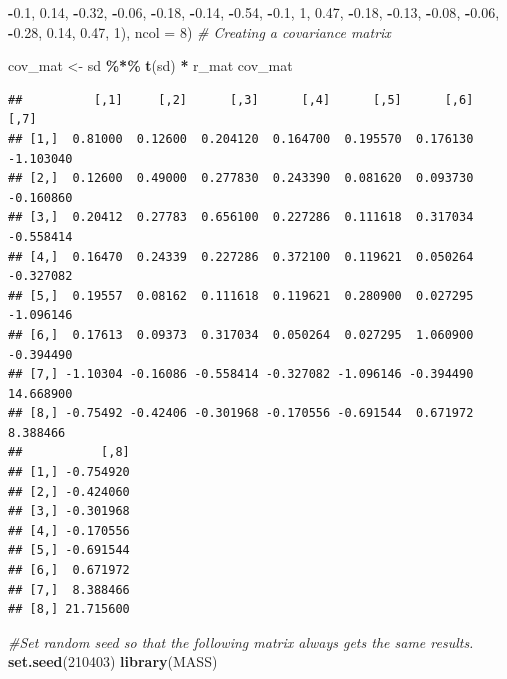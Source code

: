 \documentclass[
  11pt,
]{book}
\newenvironment{Shaded}{\begin{snugshade}}{\end{snugshade}}
\newcommand{\AttributeTok}[1]{\textcolor[rgb]{0.27,0.27,0.27}{#1}}
\newcommand{\CommentTok}[1]{\textcolor[rgb]{0.37,0.37,0.37}{\textit{#1}}}
\newcommand{\DecValTok}[1]{\textcolor[rgb]{0.06,0.06,0.06}{#1}}
\newcommand{\FloatTok}[1]{\textcolor[rgb]{0.06,0.06,0.06}{#1}}
\newcommand{\FunctionTok}[1]{\textcolor[rgb]{0.27,0.27,0.27}{\textbf{#1}}}
\newcommand{\NormalTok}[1]{#1}
\newcommand{\OtherTok}[1]{\textcolor[rgb]{0.37,0.37,0.37}{#1}}
\newcommand{\SpecialCharTok}[1]{\textcolor[rgb]{0.43,0.43,0.43}{\textbf{#1}}}
\begin{document}
\begin{Shaded}
\begin{Highlighting}[]
    \SpecialCharTok{{-}}\FloatTok{0.1}\NormalTok{, }\FloatTok{0.14}\NormalTok{, }\SpecialCharTok{{-}}\FloatTok{0.32}\NormalTok{, }\SpecialCharTok{{-}}\FloatTok{0.06}\NormalTok{, }\SpecialCharTok{{-}}\FloatTok{0.18}\NormalTok{, }\SpecialCharTok{{-}}\FloatTok{0.14}\NormalTok{, }\SpecialCharTok{{-}}\FloatTok{0.54}\NormalTok{, }\SpecialCharTok{{-}}\FloatTok{0.1}\NormalTok{, }\DecValTok{1}\NormalTok{, }\FloatTok{0.47}\NormalTok{, }\SpecialCharTok{{-}}\FloatTok{0.18}\NormalTok{,}
    \SpecialCharTok{{-}}\FloatTok{0.13}\NormalTok{, }\SpecialCharTok{{-}}\FloatTok{0.08}\NormalTok{, }\SpecialCharTok{{-}}\FloatTok{0.06}\NormalTok{, }\SpecialCharTok{{-}}\FloatTok{0.28}\NormalTok{, }\FloatTok{0.14}\NormalTok{, }\FloatTok{0.47}\NormalTok{, }\DecValTok{1}\NormalTok{), }\AttributeTok{ncol =} \DecValTok{8}\NormalTok{)}
\CommentTok{\# Creating a covariance matrix}

\NormalTok{cov\_mat }\OtherTok{\textless{}{-}}\NormalTok{ sd }\SpecialCharTok{\%*\%} \FunctionTok{t}\NormalTok{(sd) }\SpecialCharTok{*}\NormalTok{ r\_mat}
\NormalTok{cov\_mat}
\end{Highlighting}
\end{Shaded}

\begin{verbatim}
##          [,1]     [,2]      [,3]      [,4]      [,5]      [,6]      [,7]
## [1,]  0.81000  0.12600  0.204120  0.164700  0.195570  0.176130 -1.103040
## [2,]  0.12600  0.49000  0.277830  0.243390  0.081620  0.093730 -0.160860
## [3,]  0.20412  0.27783  0.656100  0.227286  0.111618  0.317034 -0.558414
## [4,]  0.16470  0.24339  0.227286  0.372100  0.119621  0.050264 -0.327082
## [5,]  0.19557  0.08162  0.111618  0.119621  0.280900  0.027295 -1.096146
## [6,]  0.17613  0.09373  0.317034  0.050264  0.027295  1.060900 -0.394490
## [7,] -1.10304 -0.16086 -0.558414 -0.327082 -1.096146 -0.394490 14.668900
## [8,] -0.75492 -0.42406 -0.301968 -0.170556 -0.691544  0.671972  8.388466
##           [,8]
## [1,] -0.754920
## [2,] -0.424060
## [3,] -0.301968
## [4,] -0.170556
## [5,] -0.691544
## [6,]  0.671972
## [7,]  8.388466
## [8,] 21.715600
\end{verbatim}

\begin{Shaded}
\begin{Highlighting}[]
\CommentTok{\#Set random seed so that the following matrix always gets the same results.}
\FunctionTok{set.seed}\NormalTok{(}\DecValTok{210403}\NormalTok{)}
\FunctionTok{library}\NormalTok{(MASS)}
\end{Highlighting}
\end{Shaded}
\end{document}

